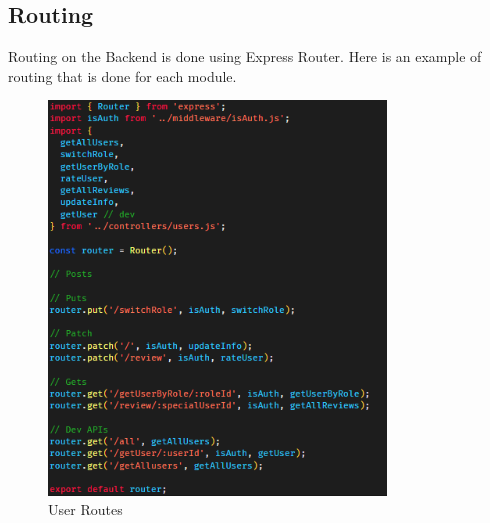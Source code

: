     \pagebreak


    \subsection{Routing}
    Routing on the Backend is done using Express Router. Here is an example of routing that is done for each module.
    \begin{figure}[h]
        \centering
        \includegraphics[width=0.8\textwidth]{images/user_Routes.png}
        \caption{User Routes}
        \label{fig:user_Routes}
    \end{figure}

    \pagebreak

